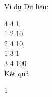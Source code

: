 Ví dụ
Dữ liệu:  

   4 4 1   
\\   1 2 10   
\\   2 4 10   
\\   1 3 1   
\\   3 4 100   
\\

   Kết quả  

   1